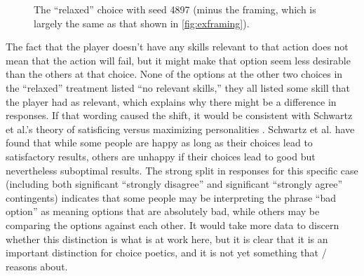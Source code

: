 \begin{figure}[h]
  \caption{The ``relaxed'' choice with seed 4897 (minus the framing, which is largely the same as that shown in \cref{fig:exframing}).}
  \label{fig:ch4897}
\end{figure}


The fact that the player doesn't have any skills relevant to that action does not mean that the action will fail, but it might make that option seem less desirable than the others at that choice.
%
None of the options at the other two choices in the ``relaxed'' treatment listed ``no relevant skills,'' they all listed some skill that the player had as relevant, which explains why there might be a difference in responses.
%
If that wording caused the shift, it would be consistent with Schwartz et al.'s theory of satisficing versus maximizing personalities \citep{Schwartz2002}.
%
Schwartz et al. have found that while some people are happy as long as their choices lead to satisfactory results, others are unhappy if their choices lead to good but nevertheless suboptimal results.
%
The strong split in responses for this specific case (including both significant ``strongly disagree'' and significant ``strongly agree'' contingents) indicates that some people may be interpreting the phrase ``bad option'' as meaning options that are absolutely bad, while others may be comparing the options against each other.
%
It would take more data to discern whether this distinction is what is at work here, but it is clear that it is an important distinction for choice poetics, and it is not yet something that \dunyazad/ reasons about.


